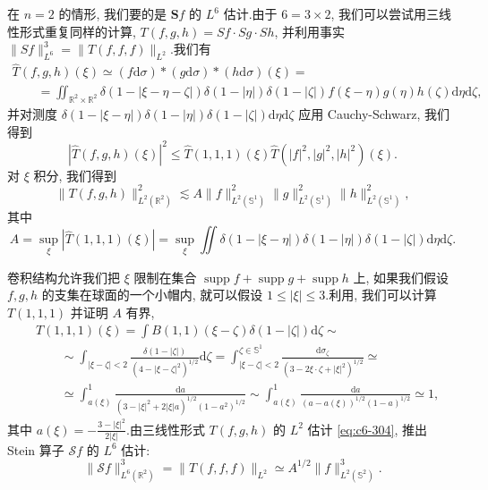 在 $n = 2$ 的情形, 我们要的是 $\boldsymbol{S} f$ 的 $L^6$ 估计.由于 $6 = 3 \times 2$, 我们可以尝试用三线性形式重复同样的计算, $T(f, g, h) = Sf \cdot Sg \cdot Sh$, 并利用事实 $\|Sf\|^3_{L^6} = \|T(f, f, f)\|_{L^2}$.我们有
\[
\begin{array}{l}
\hat{T}(f, g, h)(\xi) \simeq (f \mathrm{d}\sigma) * (g \mathrm{d}\sigma) * (h \mathrm{d}\sigma)(\xi) = \\
\qquad = \iint_{\mathbb{R}^2 \times \mathbb{R}^2} \delta(1 - |\xi - \eta - \zeta|) \delta(1 - |\eta|) \delta(1 - |\zeta|) f(\xi - \eta) g(\eta) h(\zeta) \mathrm{d}\eta \mathrm{d}\zeta,
\end{array}
\]
并对测度 $\delta(1 - |\xi - \eta|) \delta(1 - |\eta|) \delta(1 - |\zeta|) \mathrm{d}\eta \mathrm{d}\zeta$ 应用 Cauchy-Schwarz, 我们得到
\[
|\hat{T}(f, g, h)(\xi)|^2 \leq \hat{T}(1, 1, 1)(\xi) \hat{T}(|f|^2, |g|^2, |h|^2)(\xi).
\]
对 $\xi$ 积分, 我们得到
\begin{equation}
\|T(f, g, h)\|^2_{L^2(\mathbb{R}^2)} \lesssim A \|f\|^2_{L^2(\mathbb{S}^1)} \|g\|^2_{L^2(\mathbb{S}^1)} \|h\|^2_{L^2(\mathbb{S}^1)}, \label{eq:c6-304}
\end{equation}
其中
\begin{equation}
A = \sup_\xi |\hat{T}(1, 1, 1)(\xi)| = \sup_\xi \iint \delta(1 - |\xi - \eta|) \delta(1 - |\eta|) \delta(1 - |\zeta|) \mathrm{d}\eta \mathrm{d}\zeta.\label{eq:c6-305}
\end{equation}

卷积结构允许我们把 $\xi$ 限制在集合 $\operatorname{supp} f + \operatorname{supp} g + \operatorname{supp} h$ 上, 如果我们假设 $f, g, h$ 的支集在球面的一个小帽内, 就可以假设 $1 \leq |\xi| \leq 3$.利用, 我们可以计算 $T(1, 1, 1)$ 并证明 $A$ 有界,
\[
\begin{array}{rl}
& T(1, 1, 1)(\xi) = \int B(1, 1)(\xi - \zeta) \delta(1 - |\zeta|) \mathrm{d}\zeta \sim \\
& \qquad \sim \int_{|\xi - \zeta| < 2} \frac{\delta(1 - |\zeta|)}{(4 - |\xi - \zeta|^2)^{1/2}} \mathrm{d}\zeta = \int_{|\xi - \zeta| < 2}^{\zeta \in \mathbb{S}^1} \frac{\mathrm{d}\sigma_\zeta}{(3 - 2\xi \cdot \zeta + |\xi|^2)^{1/2}} \simeq \\
& \qquad \simeq \int_{a(\xi)}^1 \frac{\mathrm{d}a}{(3 - |\xi|^2 + 2|\xi| a)^{1/2} (1 - a^2)^{1/2}} \sim \int_{a(\xi)}^1 \frac{\mathrm{d}a}{(a - a(\xi))^{1/2} (1 - a)^{1/2}} \simeq 1,
\end{array}
\]
其中 $a(\xi) = -\frac{3 - |\xi|^2}{2|\xi|}$.由三线性形式 $T(f, g, h)$ 的 $L^2$ 估计 \eqref{eq:c6-304}, 推出 Stein 算子 $\mathcal{S} f$ 的 $L^6$ 估计:
\[
\|\mathcal{S} f\|^3_{L^6(\mathbb{R}^2)} = \|T(f, f, f)\|_{L^2} \simeq A^{1/2} \|f\|^3_{L^2(\mathbb{S}^2)}.
\]

